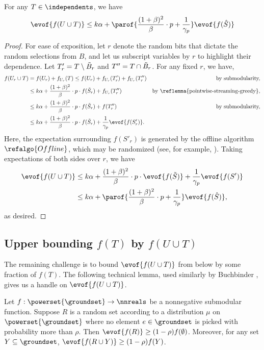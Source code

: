 \documentclass[oneside,letterpaper]{scrartcl} \usepackage{macros}
\begin{document}
\begin{lemma}
  For any $T \in \independents$, we have
  \begin{align*}
    \evof{f(\takens \cup T)} \leq k \alpha + \parof{\frac{(1 +
        \beta)^2}{\beta} \cdot p + \frac{1}{\offlineratio}}
    \evof{f(\bestset)}
  \end{align*}
\end{lemma}
\begin{proof}
  For ease of exposition, let $r$ denote the random bits that dictate
  the random selections from $B$, and let us subscript variables by
  $r$ to highlight their dependence.  Let $T'_r = T \setminus
  \tilde{B}_r$ and $T''= T \cap \tilde{B}_r$. For any fixed $r$,
  we have,
  \begin{align*}
    f(U_r \cup T) &= f(U_r) + f_{U_r}(T) \leq f(U_r) + f_{U_r}(T'_r) + f_{U_r}(T''_r) &\text{by submodularity,}\\
    &\leq k \alpha + \frac{(1+\beta)^2}{\beta} \cdot p \cdot f(\finalset_r)
    + f_{U_r}(T''_r) &\text{by \reflemma{pointwise-streaming-greedy},}\\
    &\leq k \alpha + \frac{(1 + \beta)^2}{\beta} \cdot p \cdot
    f(\finalset_r) + f(T''_r) &\text{by submodularity,} \\
    &\leq k \alpha + \frac{(1 + \beta)^2}{\beta} \cdot p \cdot
    f(\finalset_r) + \frac{1}{\offlineratio} \evof{f(S'_r)}. \end{align*}
  Here, the expectation surrounding $f(S'_r)$ is generated by the
  offline algorithm $\refalgo{Offline}$, which may be randomized (see,
  for example, ).  Taking expectations of both sides
  over $r$, we have
  \begin{align*}
    \evof{f (\takens \cup T)} &\leq k \alpha + \frac{(1 + \beta)^2}{\beta} \cdot p \cdot
    \evof{f(\finalset)} + \frac{1}{\offlineratio} \evof{f(S')} \\&\leq k \alpha + \parof{\frac{(1 + \beta)^2}{\beta} \cdot p +
      \frac{1}{\offlineratio}} \evof{f(\bestset)},
  \end{align*}
  as desired.
\end{proof}


\subsection{Upper bounding $f(T)$ by $f(U \cup T)$}

The remaining challenge is to bound $\evof{f(U \cup T)}$ from below by
some fraction of $f(T)$. The following technical lemma, used similarly
by Buchbinder \etal, gives us a handle on $\evof{f(U \cup T)}$.
\begin{lemma} Let $f: \powerset{\groundset} \to \nnreals$ be a nonnegative
  submodular function. Suppose $R$ is a random set according to a
  distribution $\mu$ on $\powerset{\groundset}$ where no element $e
  \in \groundset$ is picked with probability more than $\rho$. Then
  $\evof{f (R)} \geq (1 - \rho) f(\emptyset)$. Moreover, for any set
  $Y \subseteq \groundset$, $\evof{f(R \cup Y)} \geq (1-\rho) f(Y)$.
\end{lemma}
\end{document}
